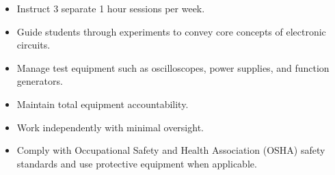 \duties
\begin{itemize}[leftmargin=*]
\item Instruct 3 separate 1 hour sessions per week. 
\item Guide students through experiments to convey core concepts of electronic circuits. 
\item Manage test equipment such as oscilloscopes, power supplies, and function generators.
\item Maintain total equipment accountability. 
\item Work independently with minimal oversight.
\item Comply with Occupational Safety and Health Association (OSHA) safety %
  standards and use protective equipment when applicable.
\end{itemize}